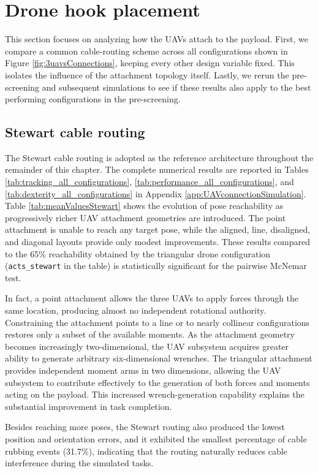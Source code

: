 \section{Drone hook placement}
\label{sec:dronehook}
This section focuses on analyzing how the UAVs attach to the payload. First, we compare a common cable-routing scheme across all configurations shown in Figure \ref{fig:3uavsConnections}, keeping every other design variable fixed. This isolates the influence of the attachment topology itself. Lastly, we rerun the pre-screening and subsequent simulations to see if these results also apply to the best performing configurations in the pre-screening.

\subsection{Stewart cable routing}
\label{sec:stewartCableRouting}
The Stewart cable routing is adopted as the reference architecture throughout the remainder of this chapter. The complete numerical results are reported in Tables \ref{tab:tracking_all_configurations}, \ref{tab:performance_all_configurations}, and \ref{tab:dexterity_all_configurations} in Appendix \ref{app:UAVconnectionSimulation}. Table \ref{tab:meanValuesStewart} shows the evolution of pose reachability as progressively richer UAV attachment geometries are introduced. The point attachment is unable to reach any target pose, while the aligned, line, disaligned, and diagonal layouts provide only modest improvements. These results compared to the 65\% reachability obtained by the triangular drone configuration (\texttt{acts\_stewart} in the table) is statistically significant for the pairwise McNemar test.

In fact, a point attachment allows the three UAVs to apply forces through the same location, producing almost no independent rotational authority. Constraining the attachment points to a line or to nearly collinear configurations restores only a subset of the available moments. As the attachment geometry becomes increasingly two-dimensional, the UAV subsystem acquires greater ability to generate arbitrary six-dimensional wrenches. The triangular attachment provides independent moment arms in two dimensions, allowing the UAV subsystem to contribute effectively to the generation of both forces and moments acting on the payload. This increased wrench-generation capability explains the substantial improvement in task completion.

Besides reaching more poses, the Stewart routing also produced the lowest position and orientation errors, and it exhibited the smallest percentage of cable rubbing events (31.7\%), indicating that the routing naturally reduces cable interference during the simulated tasks.

